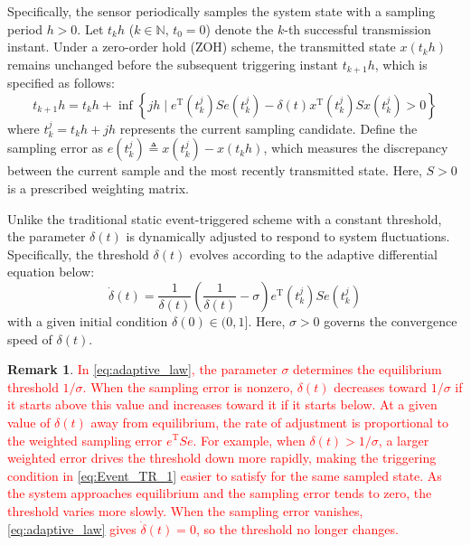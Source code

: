 \documentclass[preprint,review,fleqn,sort&compress,3p]{elsarticle}
\theoremstyle{definition} %
\theoremstyle{definition}%
\newtheorem{rem}{Remark}[section]
\begin{document}
	Specifically, the sensor periodically samples the system state with a sampling period $h>0$. Let $t_kh$ ($k \in \mathbb{N}$, $t_0 = 0$) denote the $k$-th successful transmission instant. Under a zero-order hold (ZOH) scheme, the transmitted state $x(t_k h)$ remains unchanged before the subsequent triggering instant $t_{k+1}h$, which is specified as follows:
	\begin{equation} \label{eq:Event_TR_1}
		t_{k+1}h = t_k h + \inf \left\{ jh \mid e^{\mathrm{T}}(t^j_{k}) S e(t^j_{k}) - \delta(t) x^{\mathrm{T}}(t_{k}^j) S x(t_{k}^j) > 0 \right\}
	\end{equation}
	where $t_k^j=t_kh+jh$ represents the current sampling candidate.
	Define the sampling error as
	$e(t_k^j)\triangleq x(t_k^j)-x(t_kh)$, which measures the discrepancy between the current sample and the most recently transmitted state.
	Here, $S>0$ is a prescribed weighting matrix.
	
	Unlike the traditional static event-triggered scheme with a constant threshold, the parameter $\delta(t)$ is dynamically adjusted to respond to system fluctuations. Specifically, the threshold $\delta(t)$ evolves according to the adaptive differential equation below:
	\begin{equation} \label{eq:adaptive_law}
		\dot{\delta}(t) = \frac{1}{\delta(t)} \left( \frac{1}{\delta(t)} - \sigma \right) e^{\mathrm{T}}(t^j_{k}) S e(t^j_{k})
	\end{equation}
	with a given initial condition $\delta(0) \in (0, 1]$. Here, $\sigma>0$ governs the convergence speed of $\delta(t)$.
	
	\begin{rem}
		\textcolor{red}{In \eqref{eq:adaptive_law}, the parameter $\sigma$ determines the equilibrium threshold $1/\sigma$. When the sampling error is nonzero, $\delta(t)$ decreases toward $1/\sigma$ if it starts above this value and increases toward it if it starts below. At a given value of $\delta(t)$ away from equilibrium, the rate of adjustment is proportional to the weighted sampling error $e^{\mathrm{T}}Se$. For example, when $\delta(t)>1/\sigma$, a larger weighted error drives the threshold down more rapidly, making the triggering condition in \eqref{eq:Event_TR_1} easier to satisfy for the same sampled state. As the system approaches equilibrium and the sampling error tends to zero, the threshold varies more slowly. When the sampling error vanishes, \eqref{eq:adaptive_law} gives $\dot{\delta}(t)=0$, so the threshold no longer changes.}
	\end{rem}
	
\end{document}
